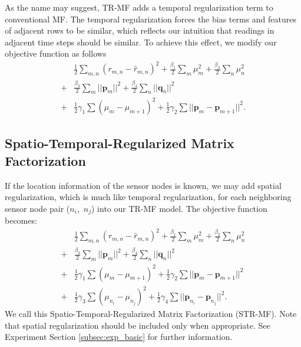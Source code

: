 As the name may suggest, TR-MF adds a temporal regularization term to conventional MF.
The temporal regularization forces the bias terms and features of adjacent rows to be similar, which reflects our intuition that readings in adjacent time steps should be similar.
To achieve this effect, we modify our objective function as follows 
\begin{equation*}\begin{aligned}
&\frac{1}{2}\sum_{m,n}{(r_{m,n} - \hat{r}_{m,n})}^2 + \frac{\beta_1}{2}\sum_m{\mu_m^2} + \frac{\beta_2}{2}\sum_n{\mu_n^2}\\
+& \frac{\beta_3}{2}\sum_m{||\mathbf{p}_m||^2} + \frac{\beta_4}{2}\sum_n{||\mathbf{q}_n||^2}\\
+& \frac{1}{2}\gamma_1\sum{(\mu_m-\mu_{m+1})^2} 
+ \frac{1}{2}\gamma_2\sum{||\mathbf{p}_m-\mathbf{p}_{m+1}||^2}.
\end{aligned}\end{equation*}

\subsection{Spatio-Temporal-Regularized Matrix Factorization}
If the location information of the sensor nodes is known, we may add spatial regularization, which is much like temporal regularization, for each neighboring sensor node pair ($n_i$,~$n_j$) into our TR-MF model.
The objective function becomes: 
\begin{equation*}\begin{aligned}
&\frac{1}{2}\sum_{m,n}{(r_{m,n} - \hat{r}_{m,n})}^2 + \frac{\beta_1}{2}\sum_m{\mu_m^2} + \frac{\beta_2}{2}\sum_n{\mu_n^2}\\
+&\frac{\beta_3}{2}\sum_m{||\mathbf{p}_m||^2} + \frac{\beta_4}{2}\sum_n{||\mathbf{q}_n||^2}\\ 
+&\frac{1}{2}\gamma_1\sum{(\mu_m-\mu_{m+1})^2}
+ \frac{1}{2}\gamma_2\sum{||\mathbf{p}_m-\mathbf{p}_{m+1}||^2}\\
+&\frac{1}{2}\gamma_3\sum{(\mu_{n_i}-\mu_{n_j})^2} 
+ \frac{1}{2}\gamma_4\sum{||\mathbf{p}_{n_i}-\mathbf{p}_{n_j}||^2}.
\end{aligned}\end{equation*}
We call this Spatio-Temporal-Regularized Matrix Factorization (STR-MF). Note that spatial regularization should be included only when appropriate. See Experiment Section \ref{subsec:exp_basic} for further information.

